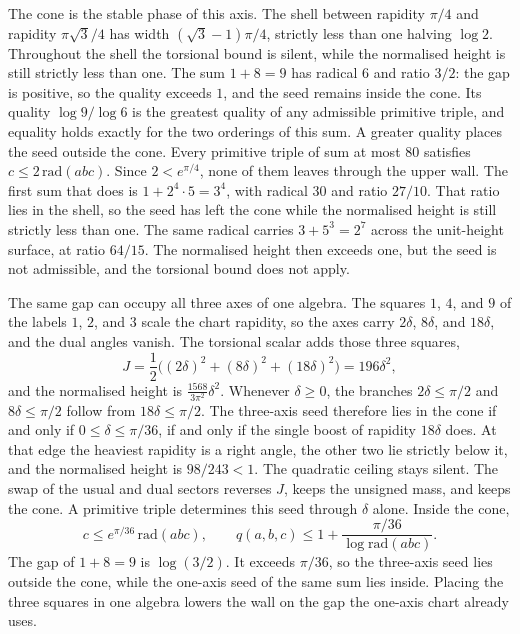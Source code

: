 \documentclass[a4paper]{article}
\theoremstyle{definition}
\theoremstyle{remark}
\begin{document}
The cone is the stable phase of this axis. The shell between rapidity \(\pi/4\) and rapidity \(\pi\sqrt{3}/4\) has width \((\sqrt{3}-1)\pi/4\), strictly less than one halving \(\log 2\). Throughout the shell the torsional bound is silent, while the normalised height is still strictly less than one. The sum \(1+8=9\) has radical \(6\) and ratio \(3/2\): the gap is positive, so the quality exceeds \(1\), and the seed remains inside the cone. Its quality \(\log 9/\log 6\) is the greatest quality of any admissible primitive triple, and equality holds exactly for the two orderings of this sum. A greater quality places the seed outside the cone. Every primitive triple of sum at most \(80\) satisfies \(c\le 2\,\mathrm{rad}(abc)\). Since \(2<e^{\pi/4}\), none of them leaves through the upper wall. The first sum that does is \(1+2^4\cdot 5=3^4\), with radical \(30\) and ratio \(27/10\). That ratio lies in the shell, so the seed has left the cone while the normalised height is still strictly less than one. The same radical carries \(3+5^3=2^7\) across the unit-height surface, at ratio \(64/15\). The normalised height then exceeds one, but the seed is not admissible, and the torsional bound does not apply.

The same gap can occupy all three axes of one algebra. The squares \(1\), \(4\), and \(9\) of the labels \(1\), \(2\), and \(3\) scale the chart rapidity, so the axes carry \(2\delta\), \(8\delta\), and \(18\delta\), and the dual angles vanish. The torsional scalar adds those three squares,
\[
J=\frac12\bigl((2\delta)^2+(8\delta)^2+(18\delta)^2\bigr)=196\delta^2,
\]
and the normalised height is \(\frac{1568}{3\pi^2}\delta^2\). Whenever \(\delta\ge 0\), the branches \(2\delta\le\pi/2\) and \(8\delta\le\pi/2\) follow from \(18\delta\le\pi/2\). The three-axis seed therefore lies in the cone if and only if \(0\le\delta\le\pi/36\), if and only if the single boost of rapidity \(18\delta\) does. At that edge the heaviest rapidity is a right angle, the other two lie strictly below it, and the normalised height is \(98/243<1\). The quadratic ceiling stays silent. The swap of the usual and dual sectors reverses \(J\), keeps the unsigned mass, and keeps the cone. A primitive triple determines this seed through \(\delta\) alone. Inside the cone,
\[
c\le e^{\pi/36}\,\mathrm{rad}(abc),
\qquad
q(a,b,c)\le 1+\frac{\pi/36}{\log\mathrm{rad}(abc)}.
\]
The gap of \(1+8=9\) is \(\log(3/2)\). It exceeds \(\pi/36\), so the three-axis seed lies outside the cone, while the one-axis seed of the same sum lies inside. Placing the three squares in one algebra lowers the wall on the gap the one-axis chart already uses.
\end{document}
